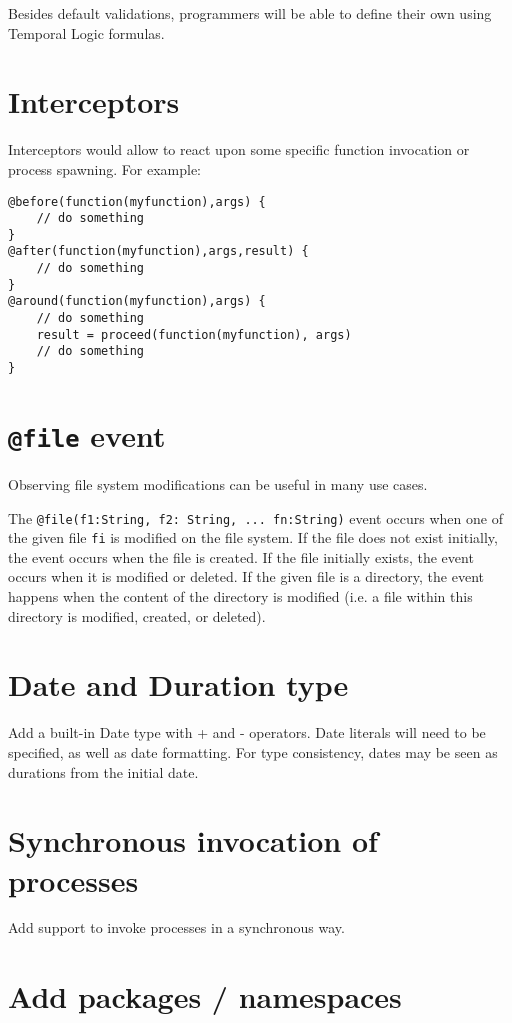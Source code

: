 \documentclass[11pt]{report}
\begin{document}
Besides default validations, programmers will be able to define their own using Temporal Logic formulas.

\section{Interceptors}

Interceptors would allow to react upon some specific function invocation or process spawning. For example:

\begin{lstlisting}[numbers=none]
@before(function(myfunction),args) {
	// do something
}
@after(function(myfunction),args,result) {
	// do something
}
@around(function(myfunction),args) {
	// do something
	result = proceed(function(myfunction), args)
	// do something
}
\end{lstlisting}

\section{\texttt{@file} event}

Observing file system modifications can be useful in many use cases.

The \texttt{@file(f1:String, f2: String, ... fn:String)} event occurs when one of the given file \texttt{fi} is modified on the file system. If the file does not exist initially, the event occurs when the file is created. If the file initially exists, the event occurs when it is modified or deleted. If the given file is a directory, the event happens when the content of the directory is modified (i.e. a file within this directory is modified, created, or deleted).

\section{Date and Duration type}

Add a built-in Date type with + and - operators. Date literals will need to be specified, as well as date formatting. For type consistency, dates may be seen as durations from the initial date.

\section{Synchronous invocation of processes}

Add support to invoke processes in a synchronous way.

\section{Add packages / namespaces}
\end{document}

